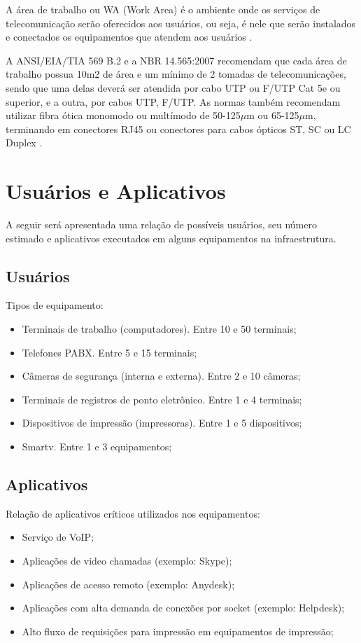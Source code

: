 \documentclass[	DIV=calc,%
							paper=a4,%
							fontsize=12pt,%
							onecolumn]{scrartcl}	 					%
\begin{document}
A área de trabalho ou WA (Work Area) é o ambiente onde os serviços de telecomunicação serão oferecidos aos usuários, ou seja, é nele que serão instalados e
conectados os equipamentos que atendem aos usuários \cite{senai2012}.

A ANSI/EIA/TIA 569 B.2 e a NBR 14.565:2007 recomendam que cada área de
trabalho possua 10m2 de área e um mínimo de 2 tomadas de telecomunicações,
sendo que uma delas deverá ser atendida por cabo UTP ou F/UTP Cat 5e ou superior, e a outra, por cabos UTP, F/UTP. As normas também recomendam utilizar
fibra ótica monomodo ou multímodo de 50-125$\mu$m ou 65-125$\mu$m, terminando em conectores RJ45 ou conectores para cabos ópticos ST, SC ou LC Duplex \cite{senai2012}.\newpage


\section{Usuários e Aplicativos}
A seguir será apresentada uma relação de possíveis usuários, seu número estimado e aplicativos executados em alguns equipamentos na infraestrutura. 
 

\subsection{Usuários}
Tipos de equipamento:
\begin{itemize}
	\item Terminais de trabalho (computadores). Entre 10 e 50 terminais;
	\item Telefones PABX. Entre 5 e 15 terminais;
	\item Câmeras de segurança (interna e externa). Entre 2 e 10 câmeras;
	\item Terminais de registros de ponto eletrônico. Entre 1 e 4 terminais;
	\item Dispositivos de impressão (impressoras). Entre 1 e 5 dispositivos;
	\item Smartv. Entre 1 e 3 equipamentos;
\end{itemize}


\subsection{Aplicativos}

Relação de aplicativos críticos utilizados nos equipamentos:

\begin{itemize}
	\item Serviço de VoIP;
	\item Aplicações de video chamadas (exemplo: Skype);
	\item Aplicações de acesso remoto (exemplo: Anydesk);
	\item Aplicações com alta demanda de conexões por socket (exemplo: Helpdesk);
	\item Alto fluxo de requisições para impressão em equipamentos de impressão;
\end{itemize}\newpage
\end{document}
